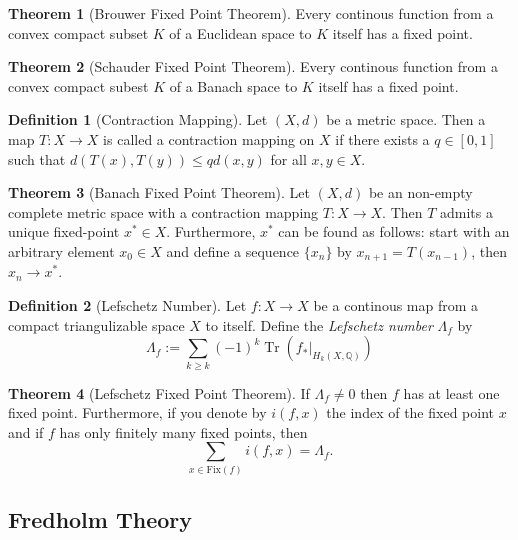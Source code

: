 \documentclass[a4paper]{article}
\newcommand{\QQ}{\mathbb{Q}}
\newcommand{\lra}{\longrightarrow}
\newcommand{\Trace}{\operatorname{Tr}}
\theoremstyle{definition}
\newtheorem{thm}{Theorem}
\theoremstyle{definition}
\newtheorem{definition}{Definition}
\theoremstyle{remark}
\theoremstyle{remark}
\theoremstyle{remark}
\begin{document}
\begin{thm}[Brouwer Fixed Point Theorem]
  Every continous function from a convex compact subset $K$ of a Euclidean space to $K$ itself has a fixed point.
\end{thm}

\begin{thm}[Schauder Fixed Point Theorem]
  Every continous function from a convex compact subest $K$ of a Banach space to $K$ itself has a fixed point.
\end{thm}

\begin{definition}[Contraction Mapping]
  Let $(X,d)$ be a metric space. Then a map $T:X\lra X$ is called a contraction mapping on $X$ if there exists a $q\in[0,1]$ such that $d(T(x),T(y))\leq qd(x,y)$ for all $x,y\in X$.
\end{definition}

\begin{thm}[Banach Fixed Point Theorem]
  Let $(X,d)$ be an non-empty complete metric space with a contraction mapping $T:X\lra X$. Then $T$ admits a unique fixed-point $x^*\in X$. Furthermore, $x^*$ can be found as follows: start with an arbitrary element $x_0\in X$ and define a sequence $\{x_n\}$ by $x_{n+1}=T(x_{n-1})$, then $x_n\lra x^*$.
\end{thm}

\begin{definition}[Lefschetz Number]
  Let $f:X\lra X$ be a continous map from a compact triangulizable space $X$ to itself. Define the \emph{Lefschetz number} $\Lambda_f$ by
  \begin{equation*}
    \Lambda_f:=\sum_{k\geq k}(-1)^k\Trace(f_*|_{H_k(X,\QQ)})
  \end{equation*}
\end{definition}

\begin{thm}[Lefschetz Fixed Point Theorem]
  If $\Lambda_f\neq 0$ then $f$ has at least one fixed point. Furthermore, if you denote by $i(f,x)$ the index of the fixed point $x$ and if $f$ has only finitely many fixed points, then
  \begin{equation*}
    \sum_{x\in\text{Fix}(f)}i(f,x)=\Lambda_f.
  \end{equation*}
\end{thm}

\subsection{Fredholm Theory}
\end{document}
